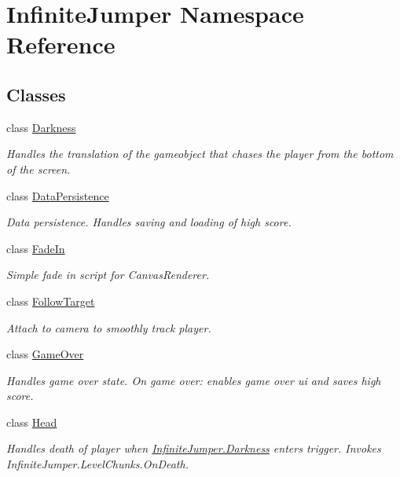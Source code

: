 \hypertarget{namespace_infinite_jumper}{}\section{Infinite\+Jumper Namespace Reference}
\label{namespace_infinite_jumper}
\subsection*{Classes}
\begin{DoxyCompactItemize}
\item 
class \hyperlink{class_infinite_jumper_1_1_darkness}{Darkness}
\begin{DoxyCompactList}\small\item\em Handles the translation of the gameobject that chases the player from the bottom of the screen. \end{DoxyCompactList}\item 
class \hyperlink{class_infinite_jumper_1_1_data_persistence}{Data\+Persistence}
\begin{DoxyCompactList}\small\item\em Data persistence. Handles saving and loading of high score. \end{DoxyCompactList}\item 
class \hyperlink{class_infinite_jumper_1_1_fade_in}{Fade\+In}
\begin{DoxyCompactList}\small\item\em Simple fade in script for Canvas\+Renderer. \end{DoxyCompactList}\item 
class \hyperlink{class_infinite_jumper_1_1_follow_target}{Follow\+Target}
\begin{DoxyCompactList}\small\item\em Attach to camera to smoothly track player. \end{DoxyCompactList}\item 
class \hyperlink{class_infinite_jumper_1_1_game_over}{Game\+Over}
\begin{DoxyCompactList}\small\item\em Handles game over state. On game over\+: enables game over ui and saves high score. \end{DoxyCompactList}\item 
class \hyperlink{class_infinite_jumper_1_1_head}{Head}
\begin{DoxyCompactList}\small\item\em Handles death of player when \hyperlink{class_infinite_jumper_1_1_darkness}{Infinite\+Jumper.\+Darkness} enters trigger. Invokes Infinite\+Jumper.\+Level\+Chunks.\+On\+Death. \end{DoxyCompactList}\item 

\end{DoxyCompactItemize}
